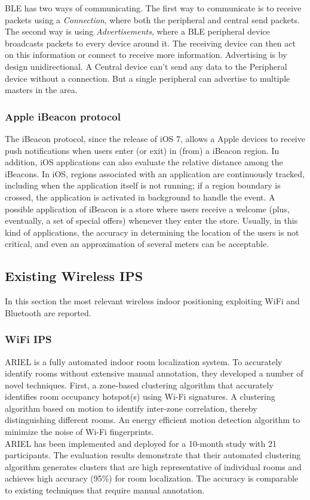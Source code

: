 BLE has two ways of communicating. The first way to communicate is to receive packets using a \emph{Connection}, where both the peripheral and central send packets.
The second way is using \emph{Advertisements}, where a BLE peripheral device broadcasts packets to every device around it. The receiving device can then act on this information or connect to receive more information.
Advertising is by design unidirectional. A Central device can't send any data to the Peripheral device without a connection. But a single peripheral can advertise to multiple masters in the area.

\subsubsection{Apple iBeacon protocol}
\label{subsec:ibeacon}
The iBeacon protocol, since the release of iOS 7, allows a Apple devices to receive push notifications when users enter (or exit) in (from) a iBeacon region. In addition, iOS applications can also evaluate the relative distance among the iBeacons. In iOS, regions associated with an application are continuously tracked, including when the application itself is not running; if a region boundary is crossed, the application is activated in background to handle the event. A possible application of iBeacon is a store where users receive a welcome (plus, eventually, a set of special offers) whenever they enter the store. Usually, in this kind of applications, the accuracy in determining the location of the users is not critical, and even an approximation of several meters can be acceptable.

\subsection{Existing Wireless IPS}
\label{subsec:wips_soa}

In this section the most relevant wireless indoor positioning exploiting WiFi and Bluetooth are reported.

\subsubsection{WiFi IPS}
\label{subsubsec:wifi_soa}

ARIEL \cite{Jiang2012} is a fully automated indoor room localization system. To accurately identify rooms without extensive manual annotation, they developed a number of novel techniques. First, a zone-based clustering algorithm that accurately identifies room occupancy hotspot(s) using Wi-Fi signatures. A clustering algorithm based on motion to identify inter-zone correlation, thereby distinguishing different rooms. An energy efficient motion detection algorithm to minimize the noise of Wi-Fi fingerprints.\\
ARIEL has been implemented and deployed for a 10-month study with 21 participants. The evaluation results demonstrate that their automated clustering algorithm generates clusters that are high representative of individual rooms and achieves high accuracy (95\%) for room localization. The accuracy is comparable to existing techniques that require manual annotation.

